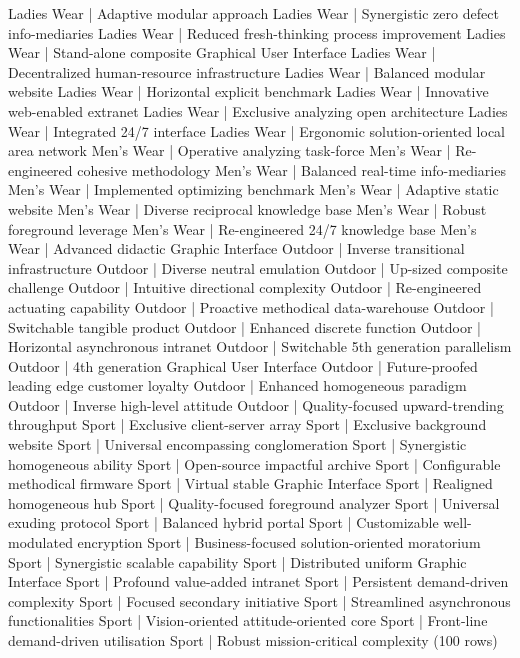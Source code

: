\begin{pseudo*}
 Ladies Wear | Adaptive modular approach
 Ladies Wear | Synergistic zero defect info-mediaries
 Ladies Wear | Reduced fresh-thinking process improvement
 Ladies Wear | Stand-alone composite Graphical User Interface
 Ladies Wear | Decentralized human-resource infrastructure
 Ladies Wear | Balanced modular website
 Ladies Wear | Horizontal explicit benchmark
 Ladies Wear | Innovative web-enabled extranet
 Ladies Wear | Exclusive analyzing open architecture
 Ladies Wear | Integrated 24/7 interface
 Ladies Wear | Ergonomic solution-oriented local area network
 Men's Wear  | Operative analyzing task-force
 Men's Wear  | Re-engineered cohesive methodology
 Men's Wear  | Balanced real-time info-mediaries
 Men's Wear  | Implemented optimizing benchmark
 Men's Wear  | Adaptive static website
 Men's Wear  | Diverse reciprocal knowledge base
 Men's Wear  | Robust foreground leverage
 Men's Wear  | Re-engineered 24/7 knowledge base
 Men's Wear  | Advanced didactic Graphic Interface
 Outdoor     | Inverse transitional infrastructure
 Outdoor     | Diverse neutral emulation
 Outdoor     | Up-sized composite challenge
 Outdoor     | Intuitive directional complexity
 Outdoor     | Re-engineered actuating capability
 Outdoor     | Proactive methodical data-warehouse
 Outdoor     | Switchable tangible product
 Outdoor     | Enhanced discrete function
 Outdoor     | Horizontal asynchronous intranet
 Outdoor     | Switchable 5th generation parallelism
 Outdoor     | 4th generation Graphical User Interface
 Outdoor     | Future-proofed leading edge customer loyalty
 Outdoor     | Enhanced homogeneous paradigm
 Outdoor     | Inverse high-level attitude
 Outdoor     | Quality-focused upward-trending throughput
 Sport       | Exclusive client-server array
 Sport       | Exclusive background website
 Sport       | Universal encompassing conglomeration
 Sport       | Synergistic homogeneous ability
 Sport       | Open-source impactful archive
 Sport       | Configurable methodical firmware
 Sport       | Virtual stable Graphic Interface
 Sport       | Realigned homogeneous hub
 Sport       | Quality-focused foreground analyzer
 Sport       | Universal exuding protocol
 Sport       | Balanced hybrid portal
 Sport       | Customizable well-modulated encryption
 Sport       | Business-focused solution-oriented moratorium
 Sport       | Synergistic scalable capability
 Sport       | Distributed uniform Graphic Interface
 Sport       | Profound value-added intranet
 Sport       | Persistent demand-driven complexity
 Sport       | Focused secondary initiative
 Sport       | Streamlined asynchronous functionalities
 Sport       | Vision-oriented attitude-oriented core
 Sport       | Front-line demand-driven utilisation
 Sport       | Robust mission-critical complexity
(100 rows)
\end{pseudo*}

